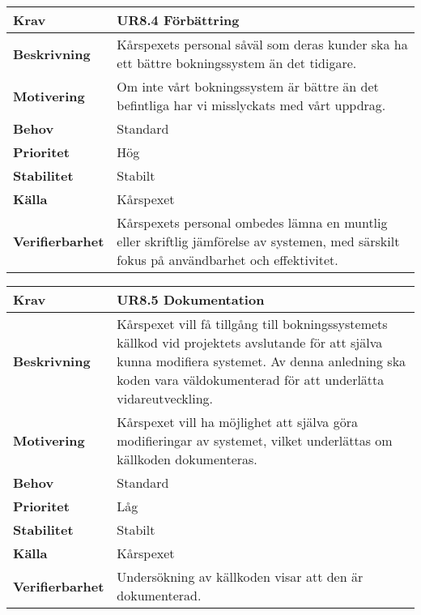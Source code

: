 \documentclass[a4paper, twoside, 11pt, titlepage]{article}
\begin{document}
		\begin {table} [ht] \begin{tabular} { p{2.6cm} p{12.5cm} }
			\hline
			{\sffamily\textbf{Krav}} & {\sffamily\textbf{UR8.4 Förbättring}} \\
			\hline
			{\sffamily\textbf{Beskrivning}} & {Kårspexets personal såväl som deras kunder ska ha ett bättre bokningssystem än det tidigare.} \\
			\hline
			{\sffamily\textbf{Motivering}} & {Om inte vårt bokningssystem är bättre än det befintliga har vi misslyckats med vårt uppdrag.} \\
			\hline
			{\sffamily\textbf{Behov}} & {Standard} \\
			\hline
			{\sffamily\textbf{Prioritet}} & {Hög} \\
			\hline
			{\sffamily\textbf{Stabilitet}} & {Stabilt} \\
			\hline
			{\sffamily\textbf{Källa}} & {Kårspexet} \\
			\hline
			{\sffamily\textbf{Verifierbarhet}} & {Kårspexets personal ombedes lämna en muntlig eller skriftlig jämförelse av systemen, med särskilt fokus på användbarhet och effektivitet.} \\
			\hline
		\end{tabular} \end{table} \FloatBarrier
		\vspace{6mm}

		\begin {table} [ht] \begin{tabular} { p{2.6cm} p{12.5cm} }
			\hline
			{\sffamily\textbf{Krav}} & {\sffamily\textbf{UR8.5 Dokumentation}} \\
			\hline
			{\sffamily\textbf{Beskrivning}} & {Kårspexet vill få tillgång till bokningssystemets källkod vid projektets avslutande för att själva kunna modifiera systemet. Av denna anledning ska koden vara väldokumenterad för att underlätta vidareutveckling.} \\
			\hline
			{\sffamily\textbf{Motivering}} & {Kårspexet vill ha möjlighet att själva göra modifieringar av systemet, vilket underlättas om källkoden dokumenteras.} \\
			\hline
			{\sffamily\textbf{Behov}} & {Standard} \\
			\hline
			{\sffamily\textbf{Prioritet}} & {Låg} \\
			\hline
			{\sffamily\textbf{Stabilitet}} & {Stabilt} \\
			\hline
			{\sffamily\textbf{Källa}} & {Kårspexet} \\
			\hline
			{\sffamily\textbf{Verifierbarhet}} & {Undersökning av källkoden visar att den är dokumenterad.} \\
			\hline
		\end{tabular} \end{table} \FloatBarrier
		\vspace{6mm}
\end{document}

